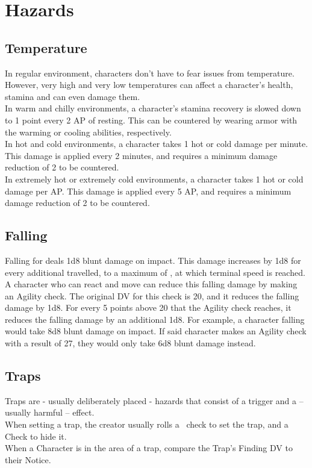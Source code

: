 \section{Hazards}\label{sec:hazards}
\subsection{Temperature}\label{subsec:temperature}
In regular environment, characters don't have to fear issues from temperature.
However, very high and very low temperatures can affect a character's health, stamina and can even damage them.\\

In warm and chilly environments, a character's stamina recovery is slowed down to 1 point every 2 AP of resting.
This can be countered by wearing armor with the warming or cooling abilities, respectively.\\

In hot and cold environments, a character takes 1 hot or cold damage per minute.
This damage is applied every 2 minutes, and requires a minimum damage reduction of 2 to be countered.\\

In extremely hot or extremely cold environments, a character takes 1 hot or cold damage per AP.
This damage is applied every 5 AP, and requires a minimum damage reduction of 2 to be countered.\\

\subsection{Falling}\label{subsec:falling}
Falling for  deals 1d8 blunt damage on impact.
This damage increases by 1d8 for every additional  travelled, to a maximum of , at which terminal speed is reached.
A character who can react and move can reduce this falling damage by making an Agility check.
The original DV for this check is 20, and it reduces the falling damage by 1d8.
For every 5 points above 20 that the Agility check reaches, it reduces the falling damage by an additional 1d8.
For example, a character falling  would take 8d8 blunt damage on impact.
If said character makes an Agility check with a result of 27, they would only take 6d8 blunt damage instead.

\subsection{Traps}\label{subsec:traps}
Traps are - usually deliberately placed - hazards that consist of a trigger and a -- usually harmful -- effect.\\
When setting a trap, the creator usually rolls a~ check to set the trap, and a~ Check to hide it.\\
When a Character is in the area of a trap, compare the Trap's Finding DV to their Notice.

